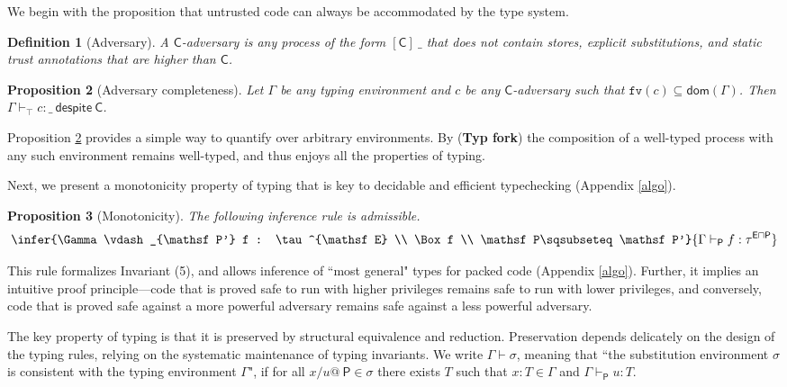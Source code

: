 \documentclass{sigplanconf}
\newcommand{\labp}{\mathsf P}
\newcommand{\labt}{\mathsf E}
\newcommand{\labc}{\mathsf C}
\newcommand{\fv}{\mathtt{fv}}
\newcommand{\trule}[1]{(\textbf{Typ #1})}
\newtheorem{definition}{Definition}[section]
\newtheorem{proposition}[definition]{Proposition}
\begin{document}
We begin with the proposition that untrusted code can always be accommodated by
the type system. 
\begin{definition}[Adversary] A $\labc$-adversary is any process of the form $[\labc]~\_$ that does not contain stores, explicit substitu\-tions, and static trust annotations that are higher than $\labc$.
\end{definition}
\begin{proposition}[Adversary completeness]\label{advtyp} Let
  $\Gamma$ be any typing environment and $c$ be any $\labc$-adversary such that $\fv(c) \subseteq
  \mathsf{dom}(\Gamma)$.
Then $\Gamma \vdash_\top c : \_~\mathsf{despite}~\labc$.
\end{proposition}
Proposition \ref{advtyp} provides a simple way to quantify over arbitrary environments. By \trule{fork} the composition of a well-typed process with any such environment remains well-typed, and thus enjoys all the properties of typing. 

Next, we present a monotonicity property of typing that is key to decidable and efficient typechecking (Appendix \ref{algo}). \begin{proposition}[Monotonicity]\label{mono} The following inference rule is admissible.
$$
\infer {\Gamma \vdash_{\labp'} f : \tau^{\labt} \\ \Box f \\ \labp \sqsubseteq \labp'}
    {\Gamma \vdash_{\labp} f : \tau^{\labt \sqcap \labp}}
$$
\end{proposition}
This rule formalizes Invariant (5), and allows inference of ``most general" types for packed code (Appendix \ref{algo}). Further, it implies an intuitive proof principle---code that is proved safe to run with higher privileges remains safe to run with lower privileges, and 
conversely, code that is proved safe against a more powerful adversary remains safe against a less powerful adversary. 

The key property of typing is that it is preserved by structural equivalence and reduction. Preservation depends delicately on the design of the typing rules, relying on the systematic maintenance of typing invariants. We write $\Gamma \vdash \sigma$, meaning that ``the substitution environment $\sigma$ is consistent with the typing environment $\Gamma$", if for all $x/u@~\labp \in \sigma$ there exists $T$ such that $x : T \in \Gamma$ and $\Gamma \vdash_{\labp} u : T$.
\end{document}

